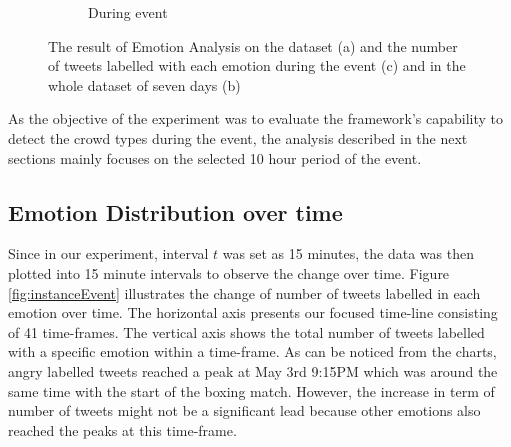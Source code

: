 \begin{figure}[htb!]
\begin{subfigure}{0.38\textwidth}
\caption{During event}
\label{fig:emotionDistributionEvent}
\end{subfigure}
\caption{The result of Emotion Analysis on the dataset (a) and the number of tweets labelled with each emotion during the event (c) and in the whole dataset of seven days (b)}
\end{figure}

As the objective of the experiment was to evaluate the framework's capability to detect the crowd types during the event, the analysis described in the next sections mainly focuses on the selected 10 hour period of the event.

\subsection{Emotion Distribution over time}
Since in our experiment, interval \(t\) was set as 15 minutes, the data was then plotted into 15 minute intervals to observe the change over time. Figure \ref{fig:instanceEvent} illustrates the change of number of tweets labelled in each emotion over time. The horizontal axis presents our focused time-line consisting of 41 time-frames. The vertical axis shows the total number of tweets labelled with a specific emotion within a time-frame. As can be noticed from the charts, angry labelled tweets reached a peak at May 3rd 9:15PM which was around the same time with the start of the boxing match. However, the increase in term of number of tweets might not be a significant lead because other emotions also reached the peaks at this time-frame.

